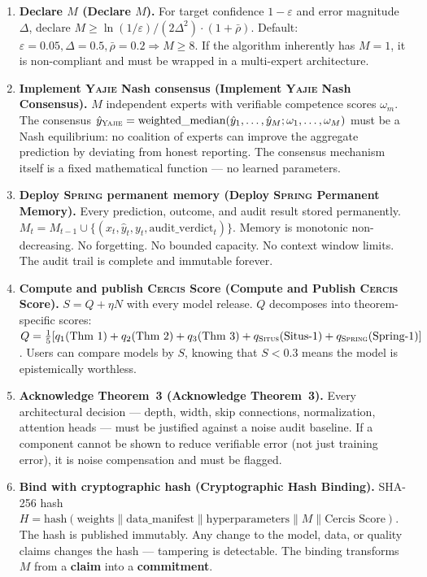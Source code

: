 \documentclass[12pt,a4paper]{article}
\theoremstyle{definition}
\newcommand{\Situs}{\textsc{Situs}}
\newcommand{\Yajie}{\textsc{Yajie}}
\newcommand{\Spring}{\textsc{Spring}}
\newcommand{\Cercis}{\textsc{Cercis}}
\begin{document}
\begin{enumerate}[label=\textbf{Requirement \arabic*:}, nosep]
    
    \item \textbf{Declare $M$ (Declare $M$).} For target confidence $1-\varepsilon$ and error magnitude $\Delta$, declare $M \ge \ln(1/\varepsilon) / (2\Delta^2) \cdot (1 + \bar{\rho})$. Default: $\varepsilon = 0.05, \Delta = 0.5, \bar{\rho} = 0.2 \Rightarrow M \ge 8$. If the algorithm inherently has $M=1$, it is non-compliant and must be wrapped in a multi-expert architecture.
    
    \item \textbf{Implement \Yajie{} Nash consensus (Implement \Yajie{} Nash Consensus).} $M$ independent experts with verifiable competence scores $\omega_m$. The consensus $\hat{y}_{\Yajie} = \text{weighted\_median}(\hat{y}_1, \ldots, \hat{y}_M; \omega_1, \ldots, \omega_M)$ must be a Nash equilibrium: no coalition of experts can improve the aggregate prediction by deviating from honest reporting. The consensus mechanism itself is a fixed mathematical function — no learned parameters.
    
    \item \textbf{Deploy \Spring{} permanent memory (Deploy \Spring{} Permanent Memory).} Every prediction, outcome, and audit result stored permanently. $M_t = M_{t-1} \cup \{(x_t, \hat{y}_t, y_t, \text{audit\_verdict}_t)\}$. Memory is monotonic non-decreasing. No forgetting. No bounded capacity. No context window limits. The audit trail is complete and immutable forever.
    
    \item \textbf{Compute and publish \Cercis{} Score (Compute and Publish \Cercis{} Score).} $S = Q + \eta N$ with every model release. $Q$ decomposes into theorem-specific scores: $Q = \frac{1}{5}[q_1(\text{Thm 1}) + q_2(\text{Thm 2}) + q_3(\text{Thm 3}) + q_{\Situs}(\text{Situs-1}) + q_{\Spring}(\text{Spring-1})]$. Users can compare models by $S$, knowing that $S < 0.3$ means the model is epistemically worthless.
    
    \item \textbf{Acknowledge Theorem~3 (Acknowledge Theorem~3).} Every architectural decision — depth, width, skip connections, normalization, attention heads — must be justified against a noise audit baseline. If a component cannot be shown to reduce verifiable error (not just training error), it is noise compensation and must be flagged.
    
    \item \textbf{Bind with cryptographic hash (Cryptographic Hash Binding).} SHA-256 hash $H = \text{hash}(\text{weights} \| \text{data\_manifest} \| \text{hyperparameters} \| M \| \text{Cercis Score})$. The hash is published immutably. Any change to the model, data, or quality claims changes the hash — tampering is detectable. The binding transforms $M$ from a \textbf{claim} into a \textbf{commitment}.
    

\end{enumerate}
\end{document}
